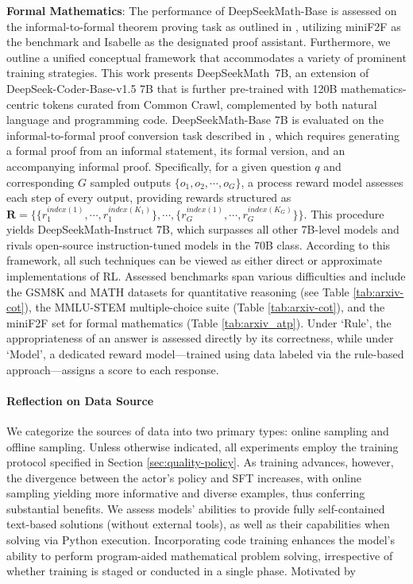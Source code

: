 
\item \textbf{Formal Mathematics}: The performance of DeepSeekMath-Base is assessed on the informal-to-formal theorem proving task as outlined in \citep{dsp_proof}, utilizing miniF2F \citep{minif2f} as the benchmark and Isabelle \citep{isabelle} as the designated proof assistant. Furthermore, we outline a unified conceptual framework that accommodates a variety of prominent training strategies. This work presents DeepSeekMath~7B, an extension of DeepSeek-Coder-Base-v1.5 7B that is further pre-trained with 120B mathematics-centric tokens curated from Common Crawl, complemented by both natural language and programming code. DeepSeekMath-Base 7B is evaluated on the informal-to-formal proof conversion task described in \citep{dsp_proof}, which requires generating a formal proof from an informal statement, its formal version, and an accompanying informal proof. Specifically, for a given question $q$ and corresponding $G$ sampled outputs $\{o_1, o_2, \cdots, o_G\}$, a process reward model assesses each step of every output, providing rewards structured as $\mathbf{R} = \{ \{r_1^{index(1)},\cdots,r_1^{index(K_1)}\}, \cdots,  \{r_G^{index(1)},\cdots,r_G^{index(K_G)}\} \}$. This procedure yields DeepSeekMath-Instruct 7B, which surpasses all other 7B-level models and rivals open-source instruction-tuned models in the 70B class. According to this framework, all such techniques can be viewed as either direct or approximate implementations of RL. Assessed benchmarks span various difficulties and include the GSM8K and MATH datasets for quantitative reasoning (see Table \ref{tab:arxiv-cot}), the MMLU-STEM multiple-choice suite (Table \ref{tab:arxiv-cot}), and the miniF2F set for formal mathematics (Table \ref{tab:arxiv_atp}). Under `Rule’, the appropriateness of an answer is assessed directly by its correctness, while under `Model’, a dedicated reward model—trained using data labeled via the rule-based approach—assigns a score to each response. \paragraph{Reflection on Data Source} We categorize the sources of data into two primary types: online sampling and offline sampling. Unless otherwise indicated, all experiments employ the training protocol specified in Section \ref{sec:quality-policy}. As training advances, however, the divergence between the actor’s policy and SFT increases, with online sampling yielding more informative and diverse examples, thus conferring substantial benefits. We assess models’ abilities to provide fully self-contained text-based solutions (without external tools), as well as their capabilities when solving via Python execution. Incorporating code training enhances the model's ability to perform program-aided mathematical problem solving, irrespective of whether training is staged or conducted in a single phase. Motivated by 